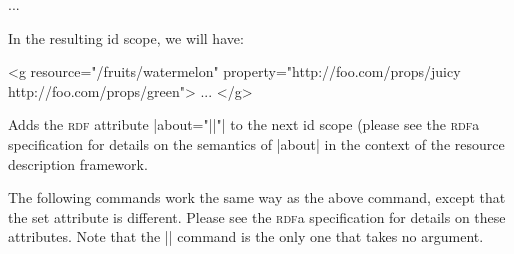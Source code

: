 \begin{codeexample}
\pgfsys@begin@idscope
  ...
\pgfsys@end@idscope
\end{codeexample}

In the resulting id scope, we will have:
\begin{codeexample}
<g resource="/fruits/watermelon"
   property="http://foo.com/props/juicy http://foo.com/props/green">
  ...
</g>  
\end{codeexample}

\begin{command}{\pgfsys@rdf@about{}}
  Adds the \textsc{rdf} attribute |about="||"| to the next
  id scope (please see the \textsc{rdf}a specification for details on
  the semantics of |about| in the context of the resource description
  framework.
\end{command}

The following commands work the same way as the above command, except
that the set attribute is different. Please see the \textsc{rdf}a
specification for details on these attributes. Note that the
|\pgfsys@rdf@inlist| command is the only one that takes no argument.

\begin{command}{\pgfsys@rdf@content{}}
\end{command}

\begin{command}{\pgfsys@rdf@datatype{}}
\end{command}

\begin{command}{\pgfsys@rdf@href{}}
\end{command}

\begin{command}{\pgfsys@rdf@inlist}
\end{command}

\begin{command}{\pgfsys@rdf@prefix{}}
\end{command}

\begin{command}{\pgfsys@rdf@property{}}
\end{command}

\begin{command}{\pgfsys@rdf@rel{}}
\end{command}

